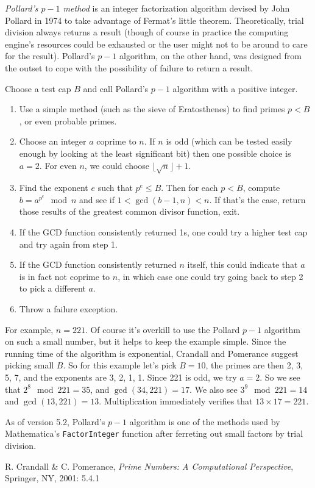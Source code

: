 \documentclass[12pt]{article}
\begin{document}
{\em Pollard's $p - 1$ method} is an integer factorization algorithm devised by John Pollard in 1974 to take advantage of Fermat's little theorem. Theoretically, trial division always returns a result (though of course in practice the computing engine's resources could be exhausted or the user might not to be around to care for the result). Pollard's $p - 1$ algorithm, on the other hand, was designed from the outset to cope with the possibility of failure to return a result.

Choose a test cap $B$ and call Pollard's $p - 1$ algorithm with a positive integer.

\begin{enumerate}
\item Use a simple method (such as the sieve of Eratosthenes) to find primes $p < B$, or even probable primes.
\item Choose an integer $a$ coprime to $n$. If $n$ is odd (which can be tested easily enough by looking at the least significant bit) then one possible choice is $a = 2$. For even $n$, we could choose $\lfloor \sqrt{n} \rfloor + 1$.
\item Find the exponent $e$ such that $p^e \le B$. Then for each $p < B$, compute $b = a^{p^e} \mod n$ and see if $1 < \gcd(b - 1, n) < n$. If that's the case, return those results of the greatest common divisor function, exit.
\item If the GCD function consistently returned 1s, one could try a higher test cap and try again from step 1.
\item If the GCD function consistently returned $n$ itself, this could indicate that $a$ is in fact not coprime to $n$, in which case one could try going back to step 2 to pick a different $a$.
\item Throw a failure exception.
\end{enumerate}

For example, $n = 221$. Of course it's overkill to use the Pollard $p - 1$ algorithm on such a small number, but it helps to keep the example simple. Since the running time of the algorithm is exponential, Crandall and Pomerance suggest picking small $B$. So for this example let's pick $B = 10$, the primes are then 2, 3, 5, 7, and the exponents are 3, 2, 1, 1. Since 221 is odd, we try $a = 2$. So we see that $2^8 \mod 221 = 35$, and $\gcd(34, 221) = 17$. We also see $3^9 \mod 221 = 14$ and $\gcd(13, 221) = 13$. Multiplication immediately verifies that $13 \times 17 = 221$.

As of version 5.2, Pollard's $p - 1$ algorithm is one of the methods used by Mathematica's \verb=FactorInteger= function after ferreting out small factors by trial division.

\begin{thebibliography}{1}
 R. Crandall \& C. Pomerance, {\it Prime Numbers: A Computational Perspective}, Springer, NY, 2001: 5.4.1
\end{thebibliography}
\end{document}
